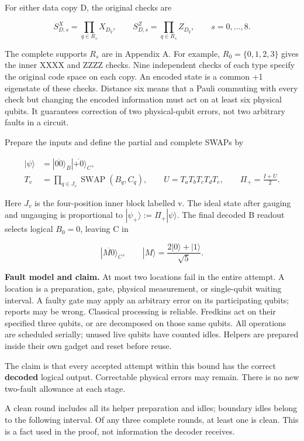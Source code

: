 \documentclass[11pt]{article}
\begin{document}
For either data copy D, the original checks are

\[
S^X_{D,s}=\prod_{q\in R_s}X_{D_q},
\qquad S^Z_{D,s}=\prod_{q\in R_s}Z_{D_q},\qquad s=0,\ldots,8.
\]

The complete supports \(R_s\) are in Appendix A. For example, \(R_0=\{0,1,2,3\}\) gives the inner XXXX and ZZZZ checks. Nine independent checks of each type specify the original code space on each copy. An encoded state is a common +1 eigenstate of these checks. Distance six means that a Pauli commuting with every check but changing the encoded information must act on at least six physical qubits. It guarantees correction of two physical-qubit errors, not two arbitrary faults in a circuit.

Prepare the inputs and define the partial and complete SWAPs by

\[
\begin{aligned}
|\psi\rangle&=|\overline{00}\rangle_B|\overline{+0}\rangle_C,\\
T_v&=\prod_{q\in J_v}\operatorname{SWAP}(B_q,C_q),\qquad
U=T_aT_bT_cT_dT_e,\qquad \Pi_+=\frac{I+U}{2}.
\end{aligned}
\]

Here \(J_v\) is the four-position inner block labelled v. The ideal state after gauging and ungauging is proportional to \(|\psi_+\rangle:=\Pi_+|\psi\rangle\). The final decoded B readout selects logical \(B_0=0\), leaving C in

\[
|\overline{M0}\rangle_C,\qquad |M\rangle=\frac{2|0\rangle+|1\rangle}{\sqrt5}.
\]

\textbf{Fault model and claim.} At most two locations fail in the entire attempt. A location is a preparation, gate, physical measurement, or single-qubit waiting interval. A faulty gate may apply an arbitrary error on its participating qubits; reports may be wrong. Classical processing is reliable. Fredkins act on their specified three qubits, or are decomposed on those same qubits. All operations are scheduled serially; unused live qubits have counted idles. Helpers are prepared inside their own gadget and reset before reuse.

The claim is that every accepted attempt within this bound has the correct \textbf{decoded} logical output. Correctable physical errors may remain. There is no new two-fault allowance at each stage.

A clean round includes all its helper preparation and idles; boundary idles belong to the following interval. Of any three complete rounds, at least one is clean. This is a fact used in the proof, not information the decoder receives.
\end{document}
